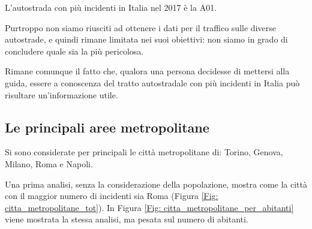 \documentclass[12pt,a4paper,final,oneside]{article}			%
\begin{document}
        L'autostrada con più incidenti in Italia nel 2017 è la A01. 
        
        Purtroppo non siamo riusciti ad ottenere i dati per il traffico sulle diverse autostrade, e quindi rimane limitata nei suoi obiettivi: non siamo in grado di concludere quale sia la più pericolosa.
        
        Rimane comunque il fatto che, qualora una persona decidesse di mettersi alla guida, essere a conoscenza del tratto autostradale con più incidenti in Italia può risultare un'informazione utile.
\clearpage
    \subsection{Le principali aree metropolitane}
        Si sono considerate per principali le città metropolitane di: Torino, Genova, Milano, Roma e Napoli. 
        
        Una prima analisi, senza la considerazione della popolazione, mostra come la città con il maggior numero di incidenti sia Roma (Figura \ref{Fig: citta_metropolitane_tot}). In Figura \ref{Fig: citta_metropolitane_per_abitanti} viene mostrata la stessa analisi, ma pesata sul numero di abitanti.
        
\end{document}
